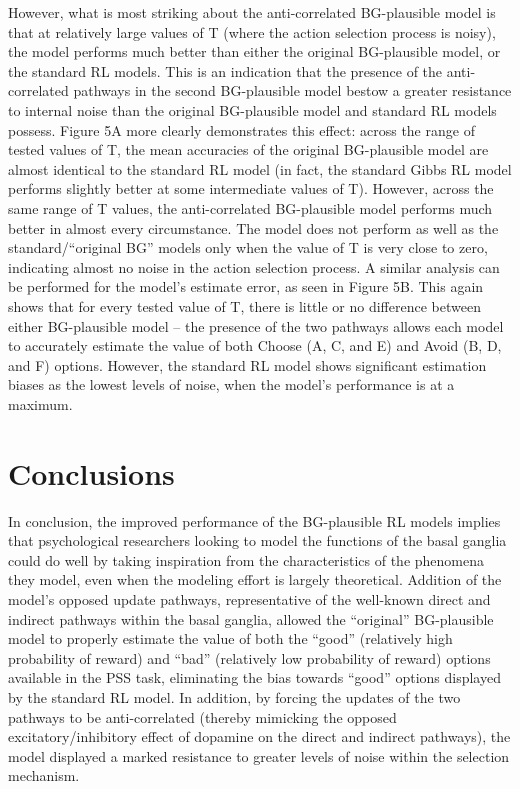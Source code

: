 \documentclass[10pt,letterpaper]{article}
\begin{document}
However, what is most striking about the anti-correlated BG-plausible model is that at relatively large values of T (where the action selection process is noisy), the model performs much better than either the original BG-plausible model, or the standard RL models. This is an indication that the presence of the anti-correlated pathways in the second BG-plausible model bestow a greater resistance to internal noise than the original BG-plausible model and standard RL models possess. Figure 5A more clearly demonstrates this effect: across the range of tested values of T, the mean accuracies of the original BG-plausible model are almost identical to the standard RL model (in fact, the standard Gibbs RL model performs slightly better at some intermediate values of T). However, across the same range of T values, the anti-correlated BG-plausible model performs much better in almost every circumstance. The model does not perform as well as the standard/``original BG'' models only when the value of T is very close to zero, indicating almost no noise in the action selection process. A similar analysis can be performed for the model’s estimate error, as seen in Figure 5B. This again shows that for every tested value of T, there is little or no difference between either BG-plausible model – the presence of the two pathways allows each model to accurately estimate the value of both Choose (A, C, and E) and Avoid (B, D, and F) options. However, the standard RL model shows significant estimation biases as the lowest levels of noise, when the model’s performance is at a maximum.

\section{Conclusions}

In conclusion, the improved performance of the BG-plausible RL models implies that psychological researchers looking to model the functions of the basal ganglia could do well by taking inspiration from the characteristics of the phenomena they model, even when the modeling effort is largely theoretical. Addition of the model’s opposed update pathways, representative of the well-known direct and indirect pathways within the basal ganglia, allowed the “original” BG-plausible model to properly estimate the value of both the “good” (relatively high probability of reward) and “bad” (relatively low probability of reward) options available in the PSS task, eliminating the bias towards “good” options displayed by the standard RL model. In addition, by forcing the updates of the two pathways to be anti-correlated (thereby mimicking the opposed excitatory/inhibitory effect of dopamine on the direct and indirect pathways), the model displayed a marked resistance to greater levels of noise within the selection mechanism.    
\end{document}
